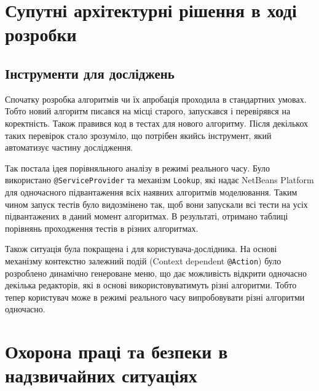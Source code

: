 \documentclass[12pt,a4paper]{article}
\begin{document}




\clearpage

\section{Супутні архітектурні рішення в ході розробки}

\subsection{Інструменти для досліджень}

Спочатку розробка алгоритмів чи їх апробація проходила в стандартних умовах. Тобто новий алгоритм писався на місці старого, запускався і перевірявся на коректність. Також правився код в тестах для нового алгоритму. Після декількох таких перевірок стало зрозуміло, що потрібен якийсь інструмент, який автоматизує частину дослідження.

Так постала ідея порівняльного аналізу в режимі реального часу. Було використано \lstinline$@ServiceProvider$ та механізм \lstinline$Lookup$, які надає NetBeans Platform для одночасного підвантаження всіх наявних алгоритмів моделювання. Таким чином запуск тестів було видозмінено так, щоб вони запускали всі тести на усіх підвантажених в даний момент алгоритмах. В результаті, отримано таблиці порівнянь проходження тестів в різних алгоритмах.

Також ситуація була покращена і для користувача-дослідника. На основі механізму контекстно залежний подій (Context dependent \lstinline$@Action$) було розроблено динамічно генероване меню, що дає можливість відкрити одночасно декілька редакторів, які в основі використовуватимуть різні алгоритми. Тобто тепер користувач може в режимі реального часу випробовувати різні алгоритми одночасно.

\clearpage

\section{Охорона праці та безпеки в надзвичайних ситуаціях}
\end{document}
